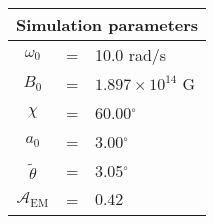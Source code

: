  \begin{tabular}{ccl}
\multicolumn{3}{c}{Simulation parameters} \\
\hline
$\omega_0$  &=& 10.0 rad/s\\
$B_0$  &=& $ 1.897\times 10^{14} $ G \\
$\chi$  &=& 60.00$^{\circ}$ \\
$a_0$ &=& 3.00$^{\circ}$ \\
$\tilde{\theta}$ &= & 3.05$^{\circ}$ \\
$\mathcal{A}_{\mathrm{EM}}$ &= & $0.42$
\end{tabular}
    